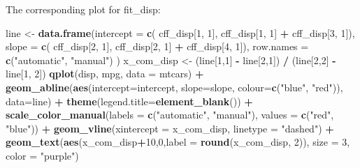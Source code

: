 \documentclass[]{article}
\newenvironment{Shaded}{\begin{snugshade}}{\end{snugshade}}
\newcommand{\KeywordTok}[1]{\textcolor[rgb]{0.13,0.29,0.53}{\textbf{#1}}}
\newcommand{\DataTypeTok}[1]{\textcolor[rgb]{0.13,0.29,0.53}{#1}}
\newcommand{\DecValTok}[1]{\textcolor[rgb]{0.00,0.00,0.81}{#1}}
\newcommand{\StringTok}[1]{\textcolor[rgb]{0.31,0.60,0.02}{#1}}
\newcommand{\OperatorTok}[1]{\textcolor[rgb]{0.81,0.36,0.00}{\textbf{#1}}}
\newcommand{\NormalTok}[1]{#1}
\begin{document}
The corresponding plot for fit\_disp:

\begin{Shaded}
\begin{Highlighting}[]
\NormalTok{line <-}\StringTok{ }\KeywordTok{data.frame}\NormalTok{(}\DataTypeTok{intercept =} \KeywordTok{c}\NormalTok{( cff_disp[}\DecValTok{1}\NormalTok{, }\DecValTok{1}\NormalTok{], cff_disp[}\DecValTok{1}\NormalTok{, }\DecValTok{1}\NormalTok{] }\OperatorTok{+}\StringTok{ }\NormalTok{cff_disp[}\DecValTok{3}\NormalTok{, }\DecValTok{1}\NormalTok{]),}
                   \DataTypeTok{slope =} \KeywordTok{c}\NormalTok{( cff_disp[}\DecValTok{2}\NormalTok{, }\DecValTok{1}\NormalTok{], cff_disp[}\DecValTok{2}\NormalTok{, }\DecValTok{1}\NormalTok{] }\OperatorTok{+}\StringTok{ }\NormalTok{cff_disp[}\DecValTok{4}\NormalTok{, }\DecValTok{1}\NormalTok{]), }
                   \DataTypeTok{row.names =} \KeywordTok{c}\NormalTok{(}\StringTok{"automatic"}\NormalTok{, }\StringTok{"manual"}\NormalTok{) )}
\NormalTok{x_com_disp <-}\StringTok{ }\NormalTok{(line[}\DecValTok{1}\NormalTok{,}\DecValTok{1}\NormalTok{] }\OperatorTok{-}\StringTok{ }\NormalTok{line[}\DecValTok{2}\NormalTok{,}\DecValTok{1}\NormalTok{]) }\OperatorTok{/}\StringTok{ }\NormalTok{(line[}\DecValTok{2}\NormalTok{,}\DecValTok{2}\NormalTok{] }\OperatorTok{-}\StringTok{ }\NormalTok{line[}\DecValTok{1}\NormalTok{, }\DecValTok{2}\NormalTok{]) }
\KeywordTok{qplot}\NormalTok{(disp, mpg, }\DataTypeTok{data =}\NormalTok{ mtcars) }\OperatorTok{+}
\StringTok{        }\KeywordTok{geom_abline}\NormalTok{(}\KeywordTok{aes}\NormalTok{(}\DataTypeTok{intercept=}\NormalTok{intercept, }\DataTypeTok{slope=}\NormalTok{slope,}
                        \DataTypeTok{colour=}\KeywordTok{c}\NormalTok{(}\StringTok{"blue"}\NormalTok{, }\StringTok{"red"}\NormalTok{)), }\DataTypeTok{data=}\NormalTok{line) }\OperatorTok{+}\StringTok{ }
\StringTok{        }\KeywordTok{theme}\NormalTok{(}\DataTypeTok{legend.title=}\KeywordTok{element_blank}\NormalTok{()) }\OperatorTok{+}
\StringTok{        }\KeywordTok{scale_color_manual}\NormalTok{(}\DataTypeTok{labels =} \KeywordTok{c}\NormalTok{(}\StringTok{"automatic"}\NormalTok{, }\StringTok{"manual"}\NormalTok{), }\DataTypeTok{values =} \KeywordTok{c}\NormalTok{(}\StringTok{"red"}\NormalTok{, }\StringTok{"blue"}\NormalTok{)) }\OperatorTok{+}\StringTok{ }
\StringTok{        }\KeywordTok{geom_vline}\NormalTok{(}\DataTypeTok{xintercept =}\NormalTok{ x_com_disp, }\DataTypeTok{linetype =} \StringTok{"dashed"}\NormalTok{) }\OperatorTok{+}\StringTok{ }
\StringTok{        }\KeywordTok{geom_text}\NormalTok{(}\KeywordTok{aes}\NormalTok{(x_com_disp}\OperatorTok{+}\DecValTok{10}\NormalTok{,}\DecValTok{0}\NormalTok{,}\DataTypeTok{label =} \KeywordTok{round}\NormalTok{(x_com_disp, }\DecValTok{2}\NormalTok{)), }\DataTypeTok{size =} \DecValTok{3}\NormalTok{,}
                  \DataTypeTok{color =} \StringTok{"purple"}\NormalTok{)}
\end{Highlighting}
\end{Shaded}
\end{document}

